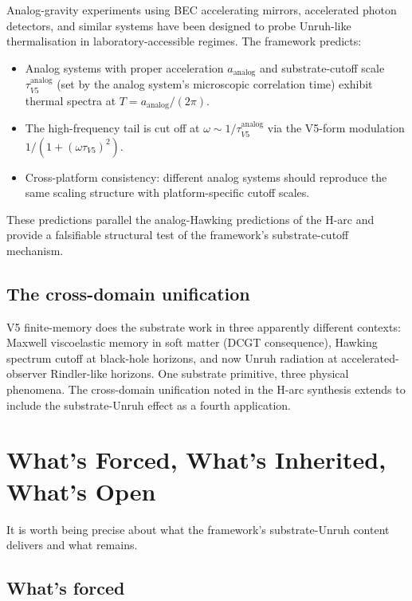 \documentclass[11pt,a4paper]{article}
\begin{document}
Analog-gravity experiments using BEC accelerating mirrors, accelerated photon detectors, and similar systems have been designed to probe Unruh-like thermalisation in laboratory-accessible regimes. The framework predicts:

\begin{itemize}[noitemsep]
\item Analog systems with proper acceleration $a_{\mathrm{analog}}$ and substrate-cutoff scale $\tau_{V5}^{\mathrm{analog}}$ (set by the analog system's microscopic correlation time) exhibit thermal spectra at $T = a_{\mathrm{analog}}/(2\pi)$.
\item The high-frequency tail is cut off at $\omega \sim 1/\tau_{V5}^{\mathrm{analog}}$ via the V5-form modulation $1/(1+(\omega\tau_{V5})^{2})$.
\item Cross-platform consistency: different analog systems should reproduce the same scaling structure with platform-specific cutoff scales.
\end{itemize}

These predictions parallel the analog-Hawking predictions of the H-arc and provide a falsifiable structural test of the framework's substrate-cutoff mechanism.

\subsection{The cross-domain unification}

V5 finite-memory does the substrate work in three apparently different contexts: Maxwell viscoelastic memory in soft matter (DCGT consequence), Hawking spectrum cutoff at black-hole horizons, and now Unruh radiation at accelerated-observer Rindler-like horizons. One substrate primitive, three physical phenomena. The cross-domain unification noted in the H-arc synthesis extends to include the substrate-Unruh effect as a fourth application.

\section{What's Forced, What's Inherited, What's Open}

It is worth being precise about what the framework's substrate-Unruh content delivers and what remains.

\subsection{What's forced}
\end{document}
